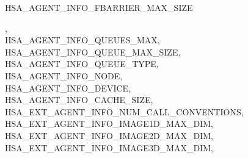 \documentclass[final,oneside]{book}
\newcommand{\reftyp}[1]{#1}
\newcommand{\refenu}[1]{\reftyp{#1}}
\newenvironment{mylongtable}{\rowcolors{0}{lightgray}{lightgray}\longtable} {
\endlongtable}
\begin{document}
\begin{mylongtable}{@{}p{\textwidth}}
\hspace{1.7em}\hypertarget{group__agentinfo_1gga39d0684207d95717d96319573b3e4a42a81f9780e49dd38b4f836289fd3647bad}{\refenu{HSA_\-AGENT_\-INFO_\-FBARRIER_\-MAX_\-SIZE}},\\
\hspace{1.7em}\hypertarget{group__agentinfo_1gga39d0684207d95717d96319573b3e4a42a06ac2144155abb87646396b0ac2c61f4}{\refenu{HSA_\-AGENT_\-INFO_\-QUEUES_\-MAX}},\\
\hspace{1.7em}\hypertarget{group__agentinfo_1gga39d0684207d95717d96319573b3e4a42acc88a2cb095e69df180ebee7aeb68c81}{\refenu{HSA_\-AGENT_\-INFO_\-QUEUE_\-MAX_\-SIZE}},\\
\hspace{1.7em}\hypertarget{group__agentinfo_1gga39d0684207d95717d96319573b3e4a42a46149fa502a210835171e0b66e16f988}{\refenu{HSA_\-AGENT_\-INFO_\-QUEUE_\-TYPE}},\\
\hspace{1.7em}\hypertarget{group__agentinfo_1gga39d0684207d95717d96319573b3e4a42a7e08d2bf6acfce669da4e810d3f7f28a}{\refenu{HSA_\-AGENT_\-INFO_\-NODE}},\\
\hspace{1.7em}\hypertarget{group__agentinfo_1gga39d0684207d95717d96319573b3e4a42a04660b9d69768cad7a7474310436ce88}{\refenu{HSA_\-AGENT_\-INFO_\-DEVICE}},\\
\hspace{1.7em}\hypertarget{group__agentinfo_1gga39d0684207d95717d96319573b3e4a42ae7fe21528c215249472e5836631759f4}{\refenu{HSA_\-AGENT_\-INFO_\-CACHE_\-SIZE}},\\
\hspace{1.7em}\hypertarget{group__agentinfo_1gga39d0684207d95717d96319573b3e4a42a97146e1b836debe1d20527c7e3dea979}{\refenu{HSA_\-EXT_\-AGENT_\-INFO_\-NUM_\-CALL_\-CONVENTIONS}},\\
\hspace{1.7em}\hypertarget{group__agentinfo_1gga39d0684207d95717d96319573b3e4a42a9ea2d28a16c614f0cac5446c8a09aa15}{\refenu{HSA_\-EXT_\-AGENT_\-INFO_\-IMAGE1D_\-MAX_\-DIM}},\\
\hspace{1.7em}\hypertarget{group__agentinfo_1gga39d0684207d95717d96319573b3e4a42ae4adcd694c486dfd67e2d00f11fc2425}{\refenu{HSA_\-EXT_\-AGENT_\-INFO_\-IMAGE2D_\-MAX_\-DIM}},\\
\hspace{1.7em}\hypertarget{group__agentinfo_1gga39d0684207d95717d96319573b3e4a42ac7e605dad393b6f73722cb5c86a968e1}{\refenu{HSA_\-EXT_\-AGENT_\-INFO_\-IMAGE3D_\-MAX_\-DIM}},\\

\end{mylongtable}
\end{document}
